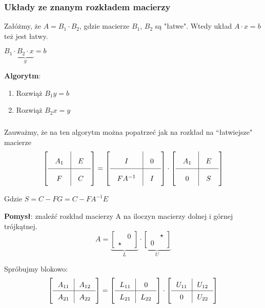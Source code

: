 \documentclass[hidelinks,a4paper,fleqn,oneside]{book}
\newcommand{\eye}{I}
\begin{document}
\subsubsection{Układy ze znanym rozkładem macierzy}

Załóżmy, że $A = B_1 \cdot B_2$, gdzie macierze $B_1$, $B_2$ są "łatwe". Wtedy układ $A\cdot x = b$ też jest łatwy.

$B_1 \cdot \underbrace{ B_2 \cdot x}_{y} = b$

\textbf{Algorytm}:

\begin{enumerate}
	\item Rozwiąż $B_1 y = b$
	\item Rozwiąż $B_2 x = y$
\end{enumerate}

\subsubsection{}

Zauważmy, że na ten algorytm można popatrzeć jak na rozkład na ``łatwiejsze" macierze
\[\arraycolsep=1em\def\arraystretch{2}
	\left[
		\begin{array}{c|c}
			A_1 & E \\ \hline
			F   & C 
		\end{array}
	\right] =
	\left[
		\begin{array}{c|c}
			\eye     & 0 \\ \hline
			F A^{-1} & I 
		\end{array}
	\right]
	\cdot 
	\left[
		\begin{array}{c|c}
			A_1 & E \\ \hline
			0   & S 
		\end{array}
	\right]
\]

Gdzie $S = C - FG = C - FA^{-1}E$


\textbf{Pomysł}: znaleźć rozkład macierzy A na iloczyn macierzy dolnej i górnej trójkątnej.
\[
	A = \underbrace{\left[
			\begin{array}{cc}
				      & 0 \\
				\star &   
			\end{array}
		\right]}_{L} \cdot
	\underbrace{\left[
			\begin{array}{cc}
				  & \star \\
				0 &       
			\end{array}
		\right]}_{U}
\]

Spróbujmy blokowo:
\[\arraycolsep=0.7em\def\arraystretch{1.4}
	\left[
		\begin{array}{c|c}
			A_{11} & A_{12} \\ \hline
			A_{21} & A_{22} 
		\end{array}
	\right] =
	\left[
		\begin{array}{c|c}
			L_{11} & 0      \\ \hline
			L_{21} & L_{22} 
		\end{array}
	\right]
	\cdot 
	\left[
		\begin{array}{c|c}
			U_{11} & U_{12} \\ \hline
			0      & U_{22}
		\end{array}
	\right]
\]
\end{document}
